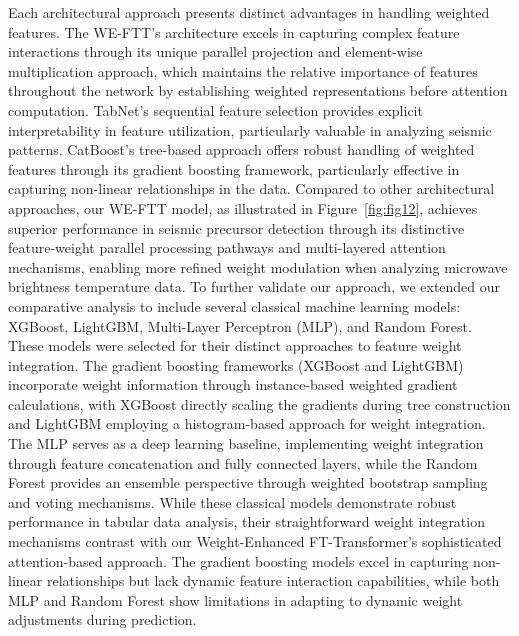 \documentclass[fleqn,10pt]{wlscirep_mdpi_style}
\begin{document}
Each architectural approach presents distinct advantages in handling weighted features. The WE-FTT's architecture excels in capturing complex feature interactions through its unique parallel projection and element-wise multiplication approach, which maintains the relative importance of features throughout the network by establishing weighted representations before attention computation. TabNet's sequential feature selection provides explicit interpretability in feature utilization, particularly valuable in analyzing seismic patterns. CatBoost's tree-based approach offers robust handling of weighted features through its gradient boosting framework, particularly effective in capturing non-linear relationships in the data. Compared to other architectural approaches, our WE-FTT model, as illustrated in Figure~\ref{fig:fig12}, achieves superior performance in seismic precursor detection through its distinctive feature-weight parallel processing pathways and multi-layered attention mechanisms, enabling more refined weight modulation when analyzing microwave brightness temperature data.
To further validate our approach, we extended our comparative analysis to include several classical machine learning models: XGBoost, LightGBM, Multi-Layer Perceptron (MLP), and Random Forest. These models were selected for their distinct approaches to feature weight integration. The gradient boosting frameworks (XGBoost and LightGBM) incorporate weight information through instance-based weighted gradient calculations, with XGBoost directly scaling the gradients during tree construction and LightGBM employing a histogram-based approach for weight integration. The MLP serves as a deep learning baseline, implementing weight integration through feature concatenation and fully connected layers, while the Random Forest provides an ensemble perspective through weighted bootstrap sampling and voting mechanisms. While these classical models demonstrate robust performance in tabular data analysis, their straightforward weight integration mechanisms contrast with our Weight-Enhanced FT-Transformer's sophisticated attention-based approach. The gradient boosting models excel in capturing non-linear relationships but lack dynamic feature interaction capabilities, while both MLP and Random Forest show limitations in adapting to dynamic weight adjustments during prediction.

\FloatBarrier 
\end{document}
